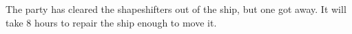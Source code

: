 The party has cleared the shapeshifters out of the ship, but one got away.
It will take 8 hours to repair the ship enough to move it.
